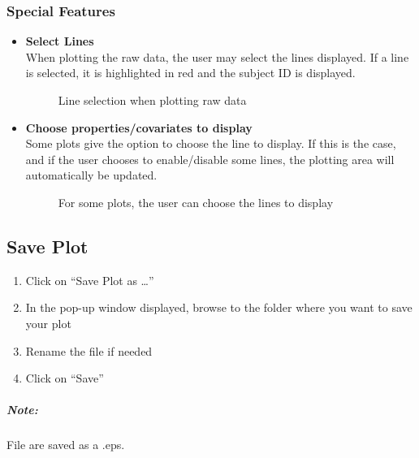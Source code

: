 \documentclass[fadttsterUserGuide_use]{subfiles}
\begin{document}
	\subsubsection{Special Features}
	\begin{itemize}
		\item \textbf{Select Lines}\\
		When plotting the raw data, the user may select the lines displayed. If a line is selected, it is highlighted in red and the subject ID is displayed.
		\begin{figure}[H]
    		\caption{Line selection when plotting raw data}
    		\label{fig:lineSelection}
		\end{figure}
		\item \textbf{Choose properties/covariates to display}\\
		Some plots give the option to choose the line to display. If this is the case, and if the user chooses to enable/disable some lines, the plotting area will automatically be updated.
		\begin{figure}[H]
    		\caption{For some plots, the user can choose the lines to display}
    		\label{fig:chooseLineToPlot}
		\end{figure}
	\end{itemize}
	\vfill
	\newpage
	
	\subsection{Save Plot}
	\begin{enumerate}
		\item Click on ``Save Plot as \ldots''
		\item In the pop-up window displayed, browse to the folder where you want to save your plot
		\item Rename the file if needed
		\item Click on ``Save''
	\end{enumerate}
	\subparagraph{\textbf{Note:}} File are saved as a .eps.
\end{document}
